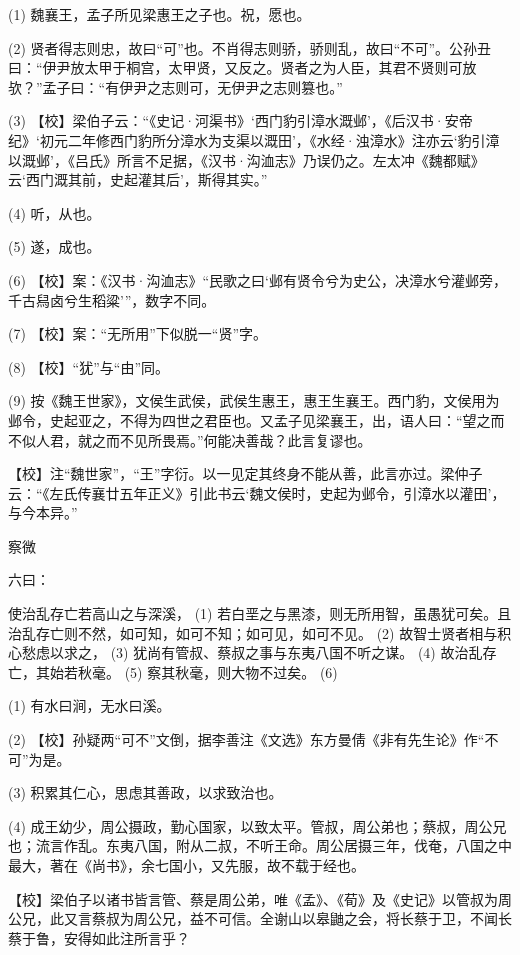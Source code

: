 \documentclass[12pt,UTF8]{ctexbook}
\begin{document}
(1) 魏襄王，孟子所见梁惠王之子也。祝，愿也。

(2) 贤者得志则忠，故曰“可”也。不肖得志则骄，骄则乱，故曰“不可”。公孙丑曰：“伊尹放太甲于桐宫，太甲贤，又反之。贤者之为人臣，其君不贤则可放欤？”孟子曰：“有伊尹之志则可，无伊尹之志则篡也。”

(3) 【校】梁伯子云：“《史记·河渠书》‘西门豹引漳水溉邺’，《后汉书·安帝纪》‘初元二年修西门豹所分漳水为支渠以溉田’，《水经·浊漳水》注亦云‘豹引漳以溉邺’，《吕氏》所言不足据，《汉书·沟洫志》乃误仍之。左太冲《魏都赋》云‘西门溉其前，史起灌其后’，斯得其实。”

(4) 听，从也。

(5) 遂，成也。

(6) 【校】案：《汉书·沟洫志》“民歌之曰‘邺有贤令兮为史公，决漳水兮灌邺旁，千古舄卤兮生稻粱’”，数字不同。

(7) 【校】案：“无所用”下似脱一“贤”字。

(8) 【校】“犹”与“由”同。

(9) 按《魏王世家》，文侯生武侯，武侯生惠王，惠王生襄王。西门豹，文侯用为邺令，史起亚之，不得为四世之君臣也。又孟子见梁襄王，出，语人曰：“望之而不似人君，就之而不见所畏焉。”何能决善哉？此言复谬也。

【校】注“魏世家”，“王”字衍。以一见定其终身不能从善，此言亦过。梁仲子云：“《左氏传襄廿五年正义》引此书云‘魏文侯时，史起为邺令，引漳水以灌田’，与今本异。”





察微


六曰：

使治乱存亡若高山之与深溪， (1) 若白垩之与黑漆，则无所用智，虽愚犹可矣。且治乱存亡则不然，如可知，如可不知；如可见，如可不见。 (2) 故智士贤者相与积心愁虑以求之， (3) 犹尚有管叔、蔡叔之事与东夷八国不听之谋。 (4) 故治乱存亡，其始若秋毫。 (5) 察其秋毫，则大物不过矣。 (6)

(1) 有水曰涧，无水曰溪。

(2) 【校】孙疑两“可不”文倒，据李善注《文选》东方曼倩《非有先生论》作“不可”为是。

(3) 积累其仁心，思虑其善政，以求致治也。

(4) 成王幼少，周公摄政，勤心国家，以致太平。管叔，周公弟也；蔡叔，周公兄也；流言作乱。东夷八国，附从二叔，不听王命。周公居摄三年，伐奄，八国之中最大，著在《尚书》，余七国小，又先服，故不载于经也。

【校】梁伯子以诸书皆言管、蔡是周公弟，唯《孟》、《荀》及《史记》以管叔为周公兄，此又言蔡叔为周公兄，益不可信。全谢山以皋鼬之会，将长蔡于卫，不闻长蔡于鲁，安得如此注所言乎？
\end{document}
